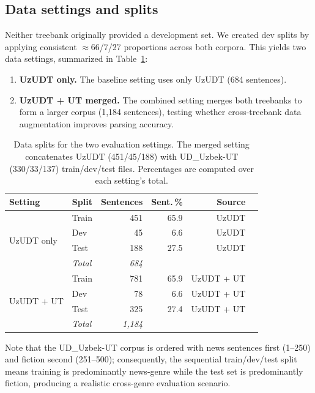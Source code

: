 \documentclass[runningheads]{llncs}
\begin{document}
\subsection{Data settings and splits}
\label{subsec:splits}
Neither treebank originally provided a development set. We created dev splits by applying consistent $\approx$66/7/27 proportions across both corpora. This yields two data settings, summarized in Table~\ref{tab:data_splits}:

\begin{enumerate}
    \item \textbf{UzUDT only.} The baseline setting uses only UzUDT (684 sentences).
    \item \textbf{UzUDT + UT merged.} The combined setting merges both treebanks to form a larger corpus (1{,}184 sentences), testing whether cross-treebank data augmentation improves parsing accuracy.
\end{enumerate}

\begin{table}[t]
\centering
\small
\begin{tabular*}{\textwidth}{@{\extracolsep{\fill}}llrrrr@{}}
\toprule
\textbf{Setting} & \textbf{Split} & \textbf{Sentences} & \textbf{Sent.\,\%} & \textbf{Source} \\
\midrule
\multirow{4}{*}{UzUDT only} & Train & 451 & 65.9 & UzUDT \\
 & Dev & 45 & 6.6 & UzUDT \\
 & Test & 188 & 27.5 & UzUDT \\
 & \textit{Total} & \textit{684} & & \\
\midrule
\multirow{4}{*}{UzUDT + UT} & Train & 781 & 65.9 & UzUDT + UT \\
 & Dev & 78 & 6.6 & UzUDT + UT \\
 & Test & 325 & 27.4 & UzUDT + UT \\
 & \textit{Total} & \textit{1{,}184} & & \\
\bottomrule
\end{tabular*}
\caption{Data splits for the two evaluation settings. The merged setting concatenates UzUDT (451/45/188) with UD\_Uzbek-UT (330/33/137) train/dev/test files. Percentages are computed over each setting's total.}
\label{tab:data_splits}
\end{table}

Note that the UD\_Uzbek-UT corpus is ordered with news sentences first (1--250) and fiction second (251--500); consequently, the sequential train/dev/test split means training is predominantly news-genre while the test set is predominantly fiction, producing a realistic cross-genre evaluation scenario.
\end{document}
